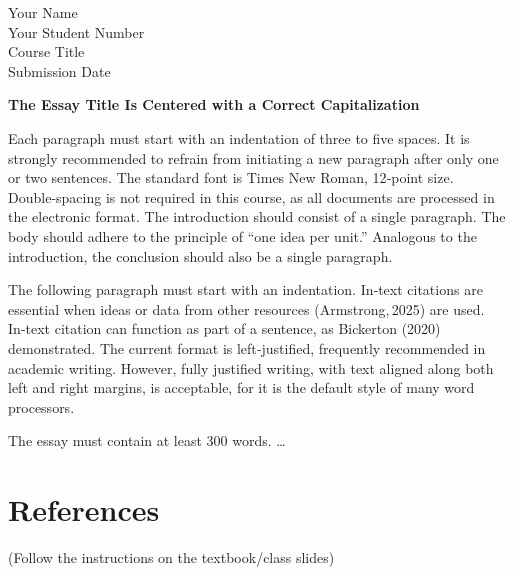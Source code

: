 \documentclass[lualatex,ja=standard]{bxjsarticle}
\begin{document}
\begin{flushleft}
Your Name\\
Your Student Number\\
Course Title\\
Submission Date\\
\end{flushleft}

\vspace{2\baselineskip}

\begin{center}
{\Large\bfseries The Essay Title Is Centered with a Correct Capitalization}
\end{center}

\vspace{2\baselineskip}

Each paragraph must start with an indentation of three to five spaces. It is strongly
recommended to refrain from initiating a new paragraph after only one or two
sentences. The standard font is Times New Roman, 12‑point size. Double‑spacing
is not required in this course, as all documents are processed in the electronic
format. The introduction should consist of a single paragraph. The body should
adhere to the principle of ``one idea per unit.'' Analogous to the introduction, the
conclusion should also be a single paragraph.

\par

The following paragraph must start with an indentation. In‑text citations are
essential when ideas or data from other resources (Armstrong, 2025) are used.
In‑text citation can function as part of a sentence, as Bickerton (2020) demonstrated.
The current format is left‑justified, frequently recommended in academic writing.
However, fully justified writing, with text aligned along both left and right margins,
is acceptable, for it is the default style of many word processors.

\par

The essay must contain at least 300 words. \dots

\vspace{2\baselineskip}

\section*{References}

(Follow the instructions on the textbook/class slides)
\end{document}
